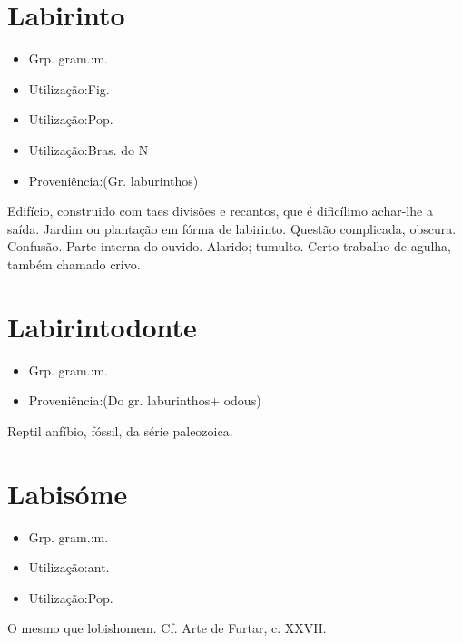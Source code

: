 \section{Labirinto}
\begin{itemize}
\item {Grp. gram.:m.}
\end{itemize}
\begin{itemize}
\item {Utilização:Fig.}
\end{itemize}
\begin{itemize}
\item {Utilização:Pop.}
\end{itemize}
\begin{itemize}
\item {Utilização:Bras. do N}
\end{itemize}
\begin{itemize}
\item {Proveniência:(Gr. \textunderscore laburinthos\textunderscore )}
\end{itemize}
Edifício, construido com taes divisões e recantos, que é dificílimo achar-lhe a saída.
Jardim ou plantação em fórma de labirinto.
Questão complicada, obscura.
Confusão.
Parte interna do ouvido.
Alarido; tumulto.
Certo trabalho de agulha, também chamado \textunderscore crivo\textunderscore .
\section{Labirintodonte}
\begin{itemize}
\item {Grp. gram.:m.}
\end{itemize}
\begin{itemize}
\item {Proveniência:(Do gr. \textunderscore laburinthos\textunderscore  + \textunderscore odous\textunderscore )}
\end{itemize}
Reptil anfíbio, fóssil, da série paleozoica.
\section{Labisóme}
\begin{itemize}
\item {Grp. gram.:m.}
\end{itemize}
\begin{itemize}
\item {Utilização:ant.}
\end{itemize}
\begin{itemize}
\item {Utilização:Pop.}
\end{itemize}
O mesmo que \textunderscore lobishomem\textunderscore . Cf. \textunderscore Arte de Furtar\textunderscore , c. XXVII.
